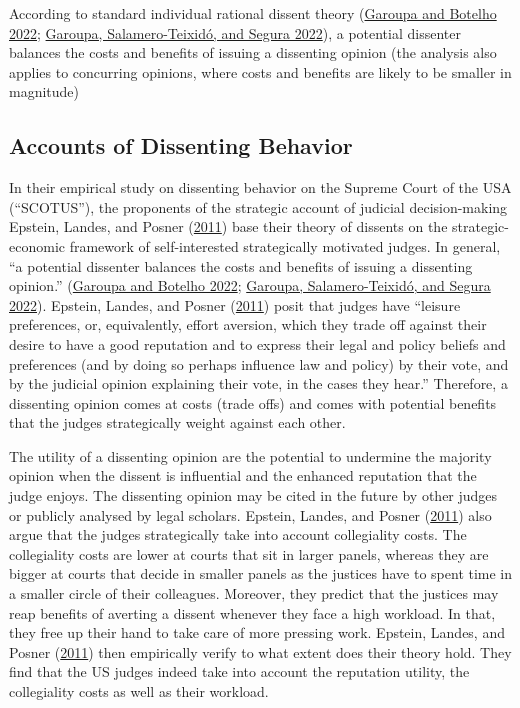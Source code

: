 \documentclass[
  11pt,
]{article}
\begin{document}
According to standard individual rational dissent theory
(\protect\hyperlink{ref-garoupaJudicialDissentCollegial2022}{Garoupa and
Botelho 2022};
\protect\hyperlink{ref-garoupaDisagreeingPrivateDissenting2022}{Garoupa,
Salamero-Teixidó, and Segura 2022}), a potential dissenter balances the
costs and benefits of issuing a dissenting opinion (the analysis also
applies to concurring opinions, where costs and benefits are likely to
be smaller in magnitude)

\hypertarget{dissenting-behavior}{%
\subsection{Accounts of Dissenting Behavior}\label{dissenting-behavior}}

In their empirical study on dissenting behavior on the Supreme Court of
the USA (``SCOTUS''), the proponents of the strategic account of
judicial decision-making Epstein, Landes, and Posner
(\protect\hyperlink{ref-epsteinWhyWhenJudges2011}{2011}) base their
theory of dissents on the strategic-economic framework of
self-interested strategically motivated judges. In general, ``a
potential dissenter balances the costs and benefits of issuing a
dissenting opinion.''
(\protect\hyperlink{ref-garoupaJudicialDissentCollegial2022}{Garoupa and
Botelho 2022};
\protect\hyperlink{ref-garoupaDisagreeingPrivateDissenting2022}{Garoupa,
Salamero-Teixidó, and Segura 2022}). Epstein, Landes, and Posner
(\protect\hyperlink{ref-epsteinWhyWhenJudges2011}{2011}) posit that
judges have ``leisure preferences, or, equivalently, effort aversion,
which they trade off against their desire to have a good reputation and
to express their legal and policy beliefs and preferences (and by doing
so perhaps influence law and policy) by their vote, and by the judicial
opinion explaining their vote, in the cases they hear.'' Therefore, a
dissenting opinion comes at costs (trade offs) and comes with potential
benefits that the judges strategically weight against each other.

The utility of a dissenting opinion are the potential to undermine the
majority opinion when the dissent is influential and the enhanced
reputation that the judge enjoys. The dissenting opinion may be cited in
the future by other judges or publicly analysed by legal scholars.
Epstein, Landes, and Posner
(\protect\hyperlink{ref-epsteinWhyWhenJudges2011}{2011}) also argue that
the judges strategically take into account collegiality costs. The
collegiality costs are lower at courts that sit in larger panels,
whereas they are bigger at courts that decide in smaller panels as the
justices have to spent time in a smaller circle of their colleagues.
Moreover, they predict that the justices may reap benefits of averting a
dissent whenever they face a high workload. In that, they free up their
hand to take care of more pressing work. Epstein, Landes, and Posner
(\protect\hyperlink{ref-epsteinWhyWhenJudges2011}{2011}) then
empirically verify to what extent does their theory hold. They find that
the US judges indeed take into account the reputation utility, the
collegiality costs as well as their workload.
\end{document}
